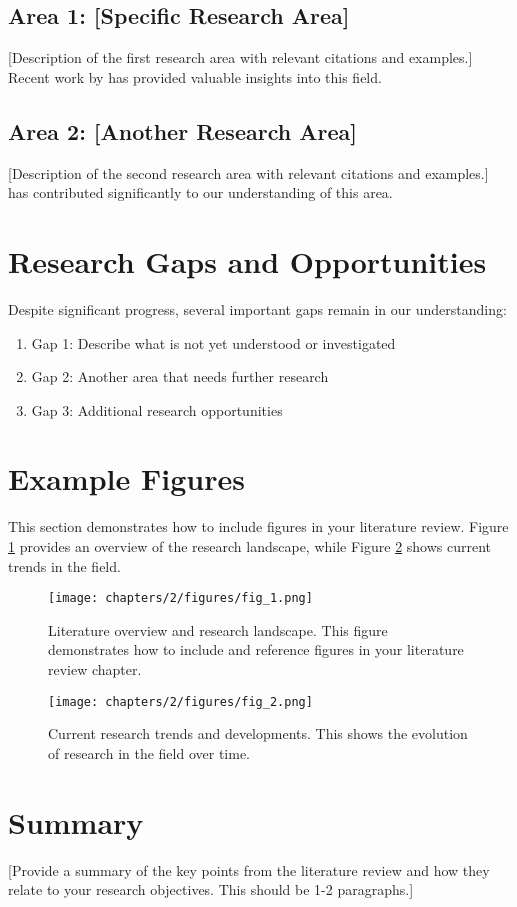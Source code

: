 \subsection{Area 1: [Specific Research Area]}
[Description of the first research area with relevant citations and examples.] Recent work by \textcite{thompson2020comprehensive} has provided valuable insights into this field.

\subsection{Area 2: [Another Research Area]}
[Description of the second research area with relevant citations and examples.] \textcite{rodriguez2021novel} has contributed significantly to our understanding of this area.

\section{Research Gaps and Opportunities}
Despite significant progress, several important gaps remain in our understanding:

\begin{enumerate}
\item Gap 1: Describe what is not yet understood or investigated
\item Gap 2: Another area that needs further research
\item Gap 3: Additional research opportunities
\end{enumerate}

\section{Example Figures}
This section demonstrates how to include figures in your literature review. Figure \ref{fig:literature_overview} provides an overview of the research landscape, while Figure \ref{fig:research_trends} shows current trends in the field.

\begin{figure}[h!tbp]
\centering
\texttt{[image: chapters/2/figures/fig\_1.png]}
\caption{Literature overview and research landscape. This figure demonstrates how to include and reference figures in your literature review chapter.}
\label{fig:literature_overview}
\end{figure}

\begin{figure}[h!tbp]
\centering
\texttt{[image: chapters/2/figures/fig\_2.png]}
\caption{Current research trends and developments. This shows the evolution of research in the field over time.}
\label{fig:research_trends}
\end{figure}

\section{Summary}
[Provide a summary of the key points from the literature review and how they relate to your research objectives. This should be 1-2 paragraphs.]